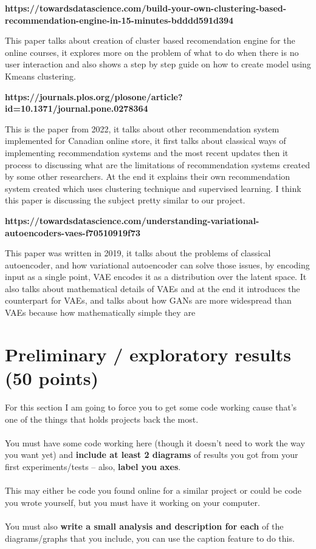 \documentclass{article}
\begin{document}
\textbf{https://towardsdatascience.com/build-your-own-clustering-based-recommendation-engine-in-15-minutes-bdddd591d394}

This paper talks about creation of cluster based recomendation engine for the online courses, it explores more on the problem of what to do when there is no user interaction and also shows a step by step guide on how to create model using Kmeans clustering.

\textbf{https://journals.plos.org/plosone/article?id=10.1371/journal.pone.0278364}

This is the paper from 2022, it talks about other recommendation system implemented for Canadian online store, it first talks about classical ways of implementing recommendation systems and the most recent updates then it process to discussing what are the limitations of recommendation systems created by some other researchers. At the end it explains their own recommendation system created which uses clustering technique and supervised learning. I think this paper is discussing the subject pretty similar to our project.

\textbf{https://towardsdatascience.com/understanding-variational-autoencoders-vaes-f70510919f73}

This paper was written in 2019, it talks about the problems of classical autoencoder, and how variational autoencoder can solve those issues, by encoding input as a single point, VAE encodes it as a distribution over the latent space. It also talks about mathematical details of VAEs and at the end it introduces the counterpart for VAEs, and talks about  how GANs are more widespread than VAEs because how mathematically simple they are
\section{Preliminary / exploratory results (50 points)}

For this section I am going to force you to get some code working cause that's one of the things that holds projects back the most. \\ \\
You must have some code working here (though it doesn't need to work the way you want yet) and \textbf{include at least 2 diagrams} of results you got from your first experiments/tests -- also, \textbf{label you axes}. \\ \\
This may either be code you found online for a similar project or could be code you wrote yourself, but you must have it working on your computer. \\ \\
You must also \textbf{write a small analysis and description for each} of the diagrams/graphs that you include, you can use the caption feature to do this. \\ \\ \\ \\
\end{document}
